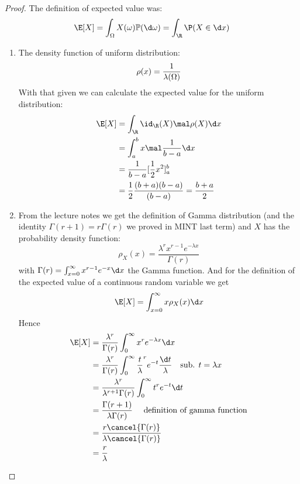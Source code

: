 \subsection{}
\begin{proof}
	The definition of expected value was:
	\[
	\E[X] = \int_{\O} X(\omega)\meas(\d \omega) = \int_{\R} \P(X \in \d x)
	\]
	\begin{enumerate}
		\item The density function of uniform distribution: 
		\[
			\rho(x) = \frac{1}{\lambda(\Omega)}
		\]
		With that given we can calculate the expected value for the uniform distribution:
		\begin{align*}
			\E[X] &= \int_{\R} \id_{\R} (X) \mal \rho(X) \d x\\
			&= \int_a^b x \mal \frac{1}{b-a} \d x\\
			&= \frac{1}{b-a} [\frac{1}{2} x^2]_a^b\\
			&= \frac{1}{2} \frac{(b+a)(b-a)}{(b-a)} = \frac{b+a}{2}
		\end{align*}
		\item From the lecture notes we get the definition of Gamma distribution (and the identity $\Gamma(r+1) = r\Gamma(r)$ we proved in MINT last term) and $X$ has the probability density function:
		\[
			\rho_X (x) = \frac{\lambda^r x^{r -1}e^{-\lambda x}}{\Gamma(r)}
		\] with $\Gamma(r) = \int_{x=0}^{\infty} x^{r-1}e^{-x}\d x$ the Gamma function. And for the definition of the expected value of a continuous random variable we get
		\[
			\E[X] = \int_{x=0}^{\infty}x \rho_X (x) \d x
		\]
		Hence
		\begin{align*}
			\E [X] &= \frac{\lambda^r}{\Gamma(r)} \int_0^{\infty} x^r e^{-\lambda x} \d x\\
			&= \frac{\lambda^r}{\Gamma(r)} \int_0^{\infty} \frac{t}{\lambda}^{r} e^{-t} \frac{\d t}{\lambda}\quad \text{sub. } t = \lambda x\\
			&= \frac{\lambda^r}{\lambda^{r +1}\Gamma(r)}\int_0^{\infty} t^r e^{-t} \d t\\
			&= \frac{\Gamma(r+1)}{\lambda \Gamma(r)} \quad \text{ definition of gamma function}\\
			&= \frac{r \cancel{\Gamma(r)}}{\lambda \cancel{\Gamma(r)}}\\
			&= \frac{r}{\lambda}
		\end{align*}
	\end{enumerate}
\end{proof}

